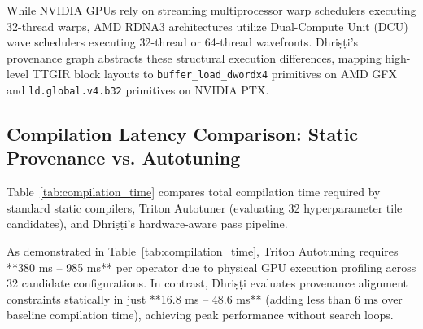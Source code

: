 \documentclass[10pt,journal,compsoc]{IEEEtran}
\begin{document}
While NVIDIA GPUs rely on streaming multiprocessor warp schedulers executing 32-thread warps, AMD RDNA3 architectures utilize Dual-Compute Unit (DCU) wave schedulers executing 32-thread or 64-thread wavefronts. Dhri\d{s}\d{t}i's provenance graph abstracts these structural execution differences, mapping high-level TTGIR block layouts to \texttt{buffer\_load\_dwordx4} primitives on AMD GFX and \texttt{ld.global.v4.b32} primitives on NVIDIA PTX.

\subsection{Compilation Latency Comparison: Static Provenance vs. Autotuning}
Table~\ref{tab:compilation_time} compares total compilation time required by standard static compilers, Triton Autotuner (evaluating 32 hyperparameter tile candidates), and Dhri\d{s}\d{t}i's hardware-aware pass pipeline.

\begin{table}[htbp]
\centering
\caption{Total Operator Compilation Time Comparison (Static Compiler vs. Triton Autotuner vs. Dhri\d{s}\d{t}i Engine).}
\label{tab:compilation_time}
\end{table}

As demonstrated in Table~\ref{tab:compilation_time}, Triton Autotuning requires **380 ms -- 985 ms** per operator due to physical GPU execution profiling across 32 candidate configurations. In contrast, Dhri\d{s}\d{t}i evaluates provenance alignment constraints statically in just **16.8 ms -- 48.6 ms** (adding less than $6\text{ ms}$ over baseline compilation time), achieving peak performance without search loops.
\end{document}
